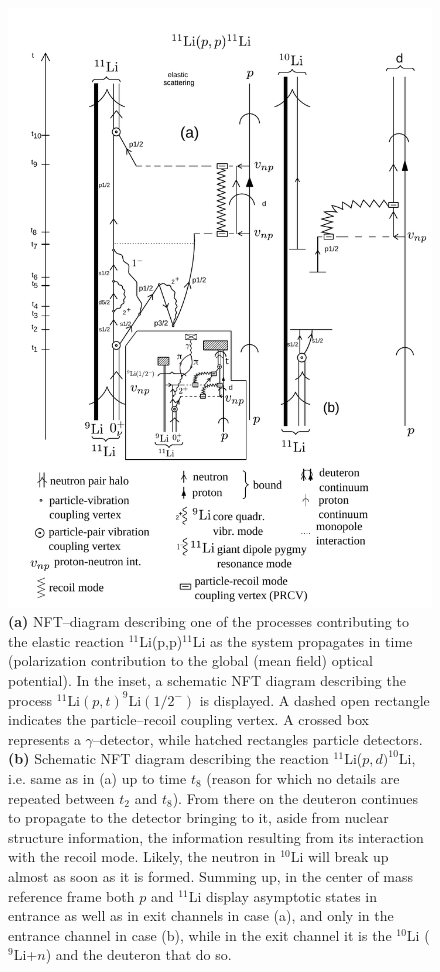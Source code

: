      \begin{figure}
     \centerline {
     \includegraphics*[width=12cm]{introduccion/figs/fig1_9_2xx}
     }
     \caption{{\bf (a)}  NFT--diagram describing  one of the processes contributing to the elastic reaction $^{11}$Li(p,p)$^{11}$Li as the system propagates in time
         	    	(polarization contribution to the global  (mean field) optical potential).  In the inset, a schematic NFT diagram describing the process $^{11}$Li$(p,t)^{9}$Li$(1/2^-)$ is displayed. A dashed open rectangle indicates the particle--recoil coupling vertex. A crossed box represents a $\gamma$--detector, while hatched rectangles particle detectors. 
         	    	 {\bf (b)} Schematic NFT diagram describing the reaction $^{11}$Li($p,d)^{10}$Li, i.e. same as in (a)  up to time $t_8$ (reason for which no  details are repeated between $t_2$ and $t_8$). From there on  the deuteron continues  to propagate  to the detector bringing to it, aside from nuclear structure information, the information resulting from its interaction with the recoil mode. Likely,  the neutron in $^{10}$Li will break up almost as soon as it is formed. 
         	    	 Summing up, in the center of mass reference frame both $p$ and $^{11}$Li display asymptotic states in entrance as well as in exit channels in case (a), and only in the entrance channel in case (b), while in the exit channel it is the $^{10}$Li ($^9$Li+$n$) and the deuteron that do so.}
     \label{fig1.9.2}
     \end{figure}
